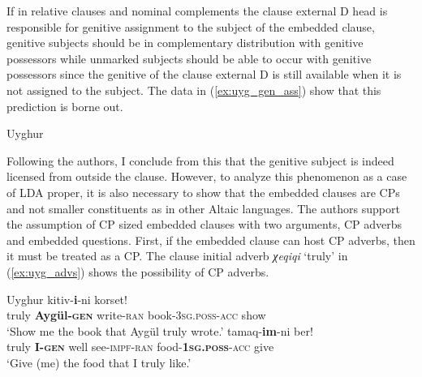 \documentclass[output=paper
,modfonts
,nonflat]{langsci/langscibook}
\begin{document}
If in relative clauses and nominal complements the clause external D head is responsible for genitive assignment to the subject of the embedded clause, genitive subjects should be in complementary distribution with genitive possessors while unmarked subjects should be able to occur with genitive possessors since the genitive of the clause external D is still available when it is not assigned to the subject. The data in (\ref{ex:uyg_gen_ass}) show that this prediction is borne out.
\begin{exe}
\ex Uyghur \citep[][3]{Asarina_Hartman2011a} \label{ex:uyg_gen_ass}
	\xlist
	\endxlist
\end{exe}
Following the authors, I conclude from this that the genitive subject is indeed licensed from outside the clause. However, to analyze this phenomenon as a case of LDA proper, it is also necessary to show that the embedded clauses are CPs and not smaller constituents as in other Altaic languages. The authors support the assumption of CP sized embedded clauses with two arguments, CP adverbs and embedded questions. First, if the embedded clause can host CP adverbs, then it must be treated as a CP. The clause initial adverb \textit{χeqiqi} `truly' in (\ref{ex:uyg_advs}) shows the possibility of CP adverbs.
\begin{exe}
\ex Uyghur \citep[][8]{Asarina_Hartman2011a}\label{ex:uyg_advs}
	\xlist
	\ex 
		  kitiv-\textbf{i}-ni korset!\\
			 {} truly \textbf{Aygül-\textsc{gen}} write-\textsc{ran} {} book-\textsc{3sg.poss}-\textsc{acc} show\\
		\glt `Show me the book that Aygül truly wrote.'
	\ex
		 tamaq-\textbf{im}-ni ber!\\
			 {} truly \textbf{I-\textsc{gen}} well see-\textsc{impf}-\textsc{ran} {} food-\textbf{\textsc{1sg.poss}}-\textsc{acc} give\\
		\glt `Give (me) the food that I truly like.'
	\endxlist
\end{exe}
\end{document}
